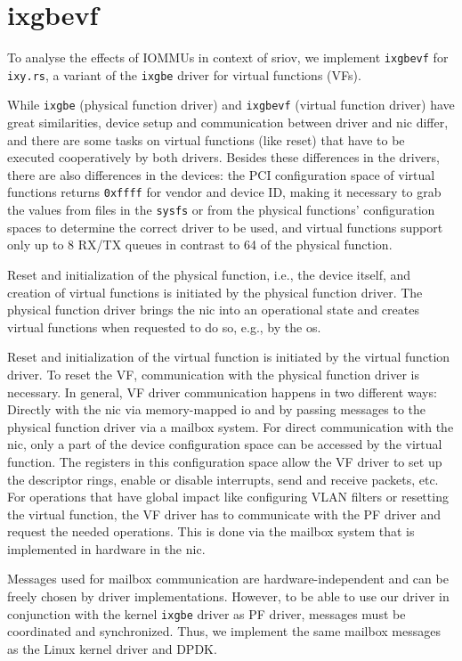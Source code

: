 \section{ixgbevf}
\label{sec:ixgbevf}

To analyse the effects of IOMMUs in context of \ac{sriov}, we implement
\texttt{ixgbevf} for \texttt{ixy.rs}, a variant of the \texttt{ixgbe} driver for
virtual functions (VFs).

While \texttt{ixgbe} (physical function driver) and \texttt{ixgbevf} (virtual
function driver) have great similarities, device setup and communication between
driver and \ac{nic} differ, and there are some tasks on virtual functions (like
reset) that have to be executed cooperatively by both drivers. Besides these
differences in the drivers, there are also differences in the devices: the PCI
configuration space of virtual functions returns \texttt{0xffff} for vendor and
device ID, making it necessary to grab the values from files in the
\texttt{sysfs} or from the physical functions' configuration spaces to determine
the correct driver to be used, and virtual functions support only up to 8 RX/TX
queues in contrast to 64 of the physical function.

Reset and initialization of the physical function, i.e., the device itself, and
creation of virtual functions is initiated by the physical function driver. The
physical function driver brings the \ac{nic} into an operational state and
creates virtual functions when requested to do so, e.g., by the \ac{os}.

Reset and initialization of the virtual function is initiated by the virtual
function driver. To reset the VF, communication with the physical function
driver is necessary. In general, VF driver communication happens in two
different ways: Directly with the \ac{nic} via memory-mapped \ac{io} and by
passing messages to the physical function driver via a mailbox system. For
direct communication with the \ac{nic}, only a part of the device configuration
space can be accessed by the virtual function. The registers in this
configuration space allow the VF driver to set up the descriptor rings, enable
or disable interrupts, send and receive packets, etc. For operations that have
global impact like configuring VLAN filters or resetting the virtual function,
the VF driver has to communicate with the PF driver and request the needed
operations. This is done via the mailbox system that is implemented in hardware
in the \ac{nic}.

Messages used for mailbox communication are hardware-independent and can be
freely chosen by driver implementations. However, to be able to use our driver
in conjunction with the kernel \texttt{ixgbe} driver as PF driver, messages must
be coordinated and synchronized. Thus, we implement the same mailbox messages as
the Linux kernel driver and DPDK.

